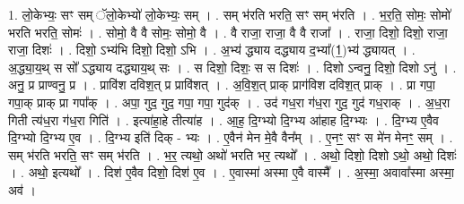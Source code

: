 \documentclass[17pt]{extarticle}
\begin{document}
1. लो॒केभ्यः॒ सꣳ सम् ॅलो॒केभ्यो॑ लो॒केभ्यः॒ सम् । . सम् भ॑रति भरति॒ सꣳ सम् भ॑रति । . भ॒र॒ति॒ सोमः॒ सोमो॑ भरति भरति॒ सोमः॑ । . सोमो॒ वै वै सोमः॒ सोमो॒ वै । . वै राजा॒ राजा॒ वै वै राजा᳚ । . राजा॒ दिशो॒ दिशो॒ राजा॒ राजा॒ दिशः॑ । . दिशो॒ ऽभ्य॑भि दिशो॒ दिशो॒ ऽभि । . अ॒भ्य॑ द्ध्याय दद्ध्याय द॒भ्या᳚(1॒)भ्य॑ द्ध्यायत् । . अ॒द्ध्या॒य॒थ् स सो᳚ ऽद्ध्याय दद्ध्याय॒थ् सः । . स दिशो॒ दिशः॒ स स दिशः॑ । . दिशो ऽन्वनु॒ दिशो॒ दिशो ऽनु॑ । . अनु॒ प्र प्राण्वनु॒ प्र । . प्रावि॑श दविश॒त् प्र प्रावि॑शत् । . अ॒वि॒श॒त् प्राक् प्राग॑विश दविश॒त् प्राक् । . प्रा गपा॒ गपा॒क् प्राक् प्रा गपा᳚क् । . अपा॒ गुद॒ गुद॒ गपा॒ गपा॒ गुद॑क् । . उद॑ गध॒रा ग॑ध॒रा गुद॒ गुद॑ गध॒राक् । . अ॒ध॒रा गिती त्य॑ध॒रा ग॑ध॒रा गिति॑ । . इत्या॑हा॒हे तीत्या॑ह । . आ॒ह॒ दि॒ग्भ्यो दि॒ग्भ्य आ॑हाह दि॒ग्भ्यः । . दि॒ग्भ्य ए॒वैव दि॒ग्भ्यो दि॒ग्भ्य ए॒व । . दि॒ग्भ्य इति॑ दिक् - भ्यः । . ए॒वैन॑ मेन मे॒वै वैन᳚म् । . ए॒नꣳ॒॒ सꣳ स मे॑न मेनꣳ॒॒ सम् । . सम् भ॑रति भरति॒ सꣳ सम् भ॑रति । . भ॒र॒ त्यथो॒ अथो॑ भरति भर॒ त्यथो᳚ । . अथो॒ दिशो॒ दिशो ऽथो॒ अथो॒ दिशः॑ । . अथो॒ इत्यथो᳚ । . दिश॑ ए॒वैव दिशो॒ दिश॑ ए॒व । . ए॒वास्मा॑ अस्मा ए॒वै वास्मै᳚ । . अ॒स्मा॒ अवावा᳚स्मा अस्मा॒ अव॑ । \newline
\end{document}
